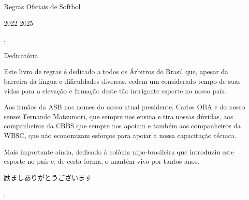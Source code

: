 \newpage
{\Huge Regras Oficiais de Softbol

 2022-2025}
\clearpage
.

\vfill
\begin{center}
	\begin{minipage}{.6\textwidth}


	{\centering\large{Dedicatória}}

	 \vspace{10mm}
	 Este livro de regras é dedicado a todos os Árbitros do Brasil que, apesar da barreira  da língua e dificuldades diversas, cedem um considerado tempo de suas vidas para a elevação e firmação deste tão intrigante esporte no nosso país.

	 Aos irmãos da ASB nos nomes do nosso atual presidente, Carlos OBA e do nosso sensei Fernando Matsumori, que sempre nos ensina e tira nossas dúvidas, aos companheiros da CBBS que sempre nos apoiam e também aos companheiros da WBSC, que não economizam esforços para apoiar a nossa capacitação técnica.

	 Mais  importante  ainda, dedicado á colônia nipo-brasileira que introduziu este esporte no país e, de certa forma, o mantém vivo por tantos anos.

\vspace{10mm}
\begin{CJK}{UTF8}{min}	励ましありがとうございます\end{CJK}
	\end{minipage}
\end{center}
\vfill.

\clearpage
\dominitoc%
\tableofcontents*

